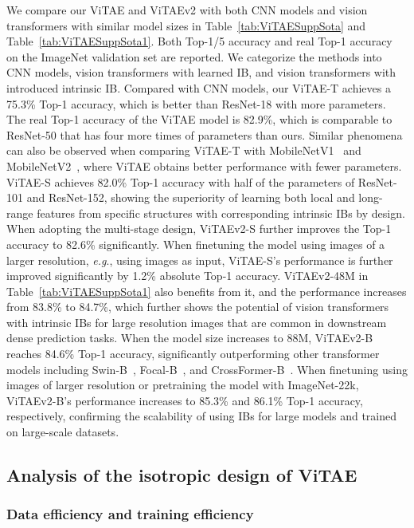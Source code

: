 \documentclass[twocolumn]{svjour3}          \smartqed  \usepackage{natbib}
\newcommand{\eg}{e.g}
\def\onedot{.\xspace}
\def\eg{\emph{e.g}\onedot}
\begin{document}
We compare our ViTAE and ViTAEv2 with both CNN models and vision transformers with similar model sizes in Table~\ref{tab:ViTAESuppSota} and Table~\ref{tab:ViTAESuppSota1}. Both Top-1/5 accuracy and real Top-1 accuracy~\citep{beyer2020we} on the ImageNet validation set are reported. We categorize the methods into CNN models, vision transformers with learned IB, and vision transformers with introduced intrinsic IB. Compared with CNN models, our ViTAE-T achieves a 75.3\% Top-1 accuracy, which is better than ResNet-18 with more parameters. The real Top-1 accuracy of the ViTAE model is 82.9\%, which is comparable to ResNet-50 that has four more times of parameters than ours. Similar phenomena can also be observed when comparing ViTAE-T with MobileNetV1~\citep{howard2017mobilenets} and MobileNetV2~\citep{sandler2018mobilenetv2}, where ViTAE obtains better performance with fewer parameters. ViTAE-S achieves 82.0\% Top-1 accuracy with half of the parameters of ResNet-101 and ResNet-152, showing the superiority of learning both local and long-range features from specific structures with corresponding intrinsic IBs by design. When adopting the multi-stage design, ViTAEv2-S further improves the Top-1 accuracy to 82.6\% significantly. When finetuning the model using images of a larger resolution, \eg, using  images as input, ViTAE-S's performance is further improved significantly by 1.2\% absolute Top-1 accuracy. ViTAEv2-48M in Table~\ref{tab:ViTAESuppSota1} also benefits from it, and the performance increases from 83.8\% to 84.7\%, which further shows the potential of vision transformers with intrinsic IBs for large resolution images that are common in downstream dense prediction tasks. When the model size increases to 88M, ViTAEv2-B reaches 84.6\% Top-1 accuracy, significantly outperforming other transformer models including Swin-B~\citep{liu2021swin}, Focal-B~\citep{yang2021focal}, and CrossFormer-B~\citep{wang2021crossformer}. When finetuning using images of larger resolution or pretraining the model with ImageNet-22k, ViTAEv2-B's performance increases to 85.3\% and 86.1\% Top-1 accuracy, respectively, confirming the scalability of using IBs for large models and trained on large-scale datasets.

\subsection{Analysis of the isotropic design of ViTAE}
\subsubsection{Data efficiency and training efficiency}
\end{document}

